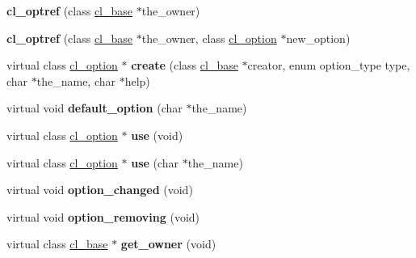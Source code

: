 \begin{DoxyCompactItemize}
\item 
\hypertarget{classcl__optref_ab7c07bbe5705316a9c23ec7c38e9c975}{
{\bfseries cl\_\-optref} (class \hyperlink{classcl__base}{cl\_\-base} $\ast$the\_\-owner)}
\label{classcl__optref_ab7c07bbe5705316a9c23ec7c38e9c975}

\item 
\hypertarget{classcl__optref_a24843e8bfc2b8db98538764339352b83}{
{\bfseries cl\_\-optref} (class \hyperlink{classcl__base}{cl\_\-base} $\ast$the\_\-owner, class \hyperlink{classcl__option}{cl\_\-option} $\ast$new\_\-option)}
\label{classcl__optref_a24843e8bfc2b8db98538764339352b83}

\item 
\hypertarget{classcl__optref_a8b46fe1d6e839680848460556882a6c2}{
virtual class \hyperlink{classcl__option}{cl\_\-option} $\ast$ {\bfseries create} (class \hyperlink{classcl__base}{cl\_\-base} $\ast$creator, enum option\_\-type type, char $\ast$the\_\-name, char $\ast$help)}
\label{classcl__optref_a8b46fe1d6e839680848460556882a6c2}

\item 
\hypertarget{classcl__optref_a0a6b5e02bd6f3e6d569525c48ad43c99}{
virtual void {\bfseries default\_\-option} (char $\ast$the\_\-name)}
\label{classcl__optref_a0a6b5e02bd6f3e6d569525c48ad43c99}

\item 
\hypertarget{classcl__optref_a221904bbfb3a18b9c7b5d4deb23b7337}{
virtual class \hyperlink{classcl__option}{cl\_\-option} $\ast$ {\bfseries use} (void)}
\label{classcl__optref_a221904bbfb3a18b9c7b5d4deb23b7337}

\item 
\hypertarget{classcl__optref_a7843e9587f17606c09dfe0939bc11a35}{
virtual class \hyperlink{classcl__option}{cl\_\-option} $\ast$ {\bfseries use} (char $\ast$the\_\-name)}
\label{classcl__optref_a7843e9587f17606c09dfe0939bc11a35}

\item 
\hypertarget{classcl__optref_a802b37c29ec2d274830269a1c372ca5a}{
virtual void {\bfseries option\_\-changed} (void)}
\label{classcl__optref_a802b37c29ec2d274830269a1c372ca5a}

\item 
\hypertarget{classcl__optref_aff9dba037ce41ea6afb578635c528335}{
virtual void {\bfseries option\_\-removing} (void)}
\label{classcl__optref_aff9dba037ce41ea6afb578635c528335}

\item 
\hypertarget{classcl__optref_a281ae14ca1cff9bb1e8cc61ded245dec}{
virtual class \hyperlink{classcl__base}{cl\_\-base} $\ast$ {\bfseries get\_\-owner} (void)}
\label{classcl__optref_a281ae14ca1cff9bb1e8cc61ded245dec}


\end{DoxyCompactItemize}

